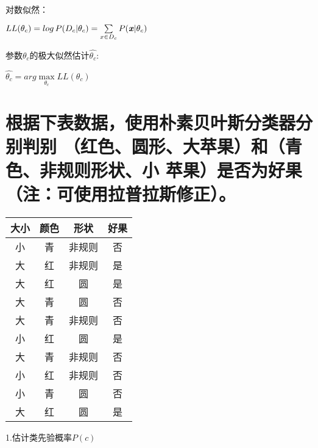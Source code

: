 \documentclass[UTF8]{ctexart}
\begin{document}
对数似然：

\begin{center}
  $LL(\theta _c)=log\,P(D_c|\theta _c)=\sum \limits_{x \in D_c}P(\textbf{\emph{x}}|\theta _c)$
\end{center}

参数$\theta_c$的极大似然估计$\hat{\theta_c}$:

\begin{center}
  $\hat{\theta_c}=arg \mathop{max}\limits_{\theta_c}LL(\theta _c)$
\end{center}

\pagestyle{plain}
\section{根据下表数据，使用朴素贝叶斯分类器分别判别
  （红色、圆形、大苹果）和（青色、非规则形状、小
  苹果）是否为好果（注：可使用拉普拉斯修正）。\\}
\begin{table}[!h]
  \centering
  \setlength{\tabcolsep}{10mm}
  \begin{tabular}{|c|c|c|c|}
    \hline
    \textbf{大小} & \textbf{颜色} & \textbf{形状} & \textbf{好果} \\ \hline
    小            & 青            & 非规则        & 否            \\ \hline
    大            & 红            & 非规则        & 是            \\ \hline
    大            & 红            & 圆            & 是            \\ \hline
    大            & 青            & 圆            & 否            \\ \hline
    大            & 青            & 非规则        & 否            \\ \hline
    小            & 红            & 圆            & 是            \\ \hline
    大            & 青            & 非规则        & 否            \\ \hline
    小            & 红            & 非规则        & 否            \\ \hline
    小            & 青            & 圆            & 否            \\ \hline
    大            & 红            & 圆            & 是            \\ \hline
  \end{tabular}
\end{table}
1.估计类先验概率$P(c)$\\
\end{document}
